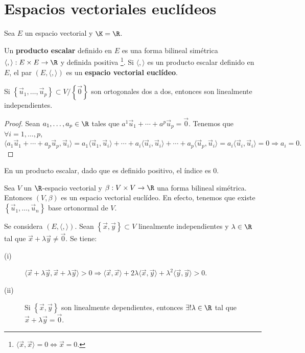 \chapter{Espacios vectoriales euclídeos}
Sea $\displaystyle E $ un espacio vectorial y $\displaystyle \K = \R $.
\begin{fdefinition}
\normalfont Un \textbf{producto escalar} definido en $\displaystyle E $ es una forma bilineal simétrica $\displaystyle \langle , \rangle : E \times E \to \R $ y definida positiva \footnote{$\displaystyle \langle \vec{x},\vec{x} \rangle = 0 \iff \vec{x} = 0 $.}. Si $\displaystyle \langle,\rangle  $ es un producto escalar definido en $\displaystyle E $, el par $\displaystyle \left(E, \langle,\rangle \right) $ es un \textbf{espacio vectorial euclídeo}.
\end{fdefinition}
\begin{fprop}[]
	\normalfont Si $\displaystyle \left\{ \vec{u}_{1}, \ldots, \vec{u}_{p}\right\} \subset V/ \left\{ \vec{0}\right\}  $ son ortogonales dos a dos, entonces son linealmente independientes.
\end{fprop}
\begin{proof}
Sean $\displaystyle a_{1}, \ldots, a_{p} \in \R $ tales que $\displaystyle a^{1}\vec{u}_{1} + \cdots + a^{p}\vec{u}_{p} = \vec{0} $.
Tenemos que $\displaystyle \forall i = 1, \ldots, p $, 
\[ \langle a_{1}\vec{u}_{1} + \cdots + a_{p}\vec{u}_{p}, \vec{u}_{i}\rangle = a_{1}\langle \vec{u}_{1}, \vec{u}_{i}\rangle + \cdots + a_{i}\langle \vec{u}_{i}, \vec{u}_{i}\rangle + \cdots + a_{p}\langle \vec{u}_{p}, \vec{u}_{i}\rangle = a_{i}\langle \vec{u}_{i}, \vec{u}_{i}\rangle = 0 \Rightarrow a_{i} = 0 .\]
\end{proof}
\begin{observation}
\normalfont En un producto escalar, dado que es definido positivo, el índice es 0.
\end{observation}
Sea $\displaystyle V $ un $\displaystyle \R $-espacio vectorial y $\displaystyle \beta : V \times V \to \R $ una forma bilineal simétrica. Entonces $\displaystyle \left(V,\beta \right) $ es un espacio vectorial euclídeo. En efecto, tenemos que existe $\displaystyle \left\{ \vec{u}_{1}, \ldots, \vec{u}_{n}\right\}  $ base ortonormal de $\displaystyle V $.
\begin{fprop}[]
	\normalfont Se considera $\displaystyle \left(E, \langle,\rangle \right) $. Sean $\displaystyle \left\{ \vec{x}, \vec{y}\right\} \subset V $ linealmente independientes y $\displaystyle \lambda \in \R $ tal que $\displaystyle \vec{x} + \lambda \vec{y} \neq \vec{0} $. Se tiene:
	\begin{description}
	\item[(i)] $\displaystyle \langle \vec{x} + \lambda \vec{y}, \vec{x} + \lambda \vec{y} \rangle > 0 \Rightarrow \langle \vec{x}, \vec{x} \rangle + 2\lambda \langle \vec{x}, \vec{y}\rangle + \lambda ^{2}\langle \vec{y}, \vec{y} \rangle >0$.
	\item[(ii)] Si $\displaystyle \left\{ \vec{x}, \vec{y}\right\}  $ son linealmente dependientes, entonces $\displaystyle \exists ! \lambda \in \R $ tal que $\displaystyle \vec{x} + \lambda \vec{y} = \vec{0} $.
	\end{description}
\end{fprop}
